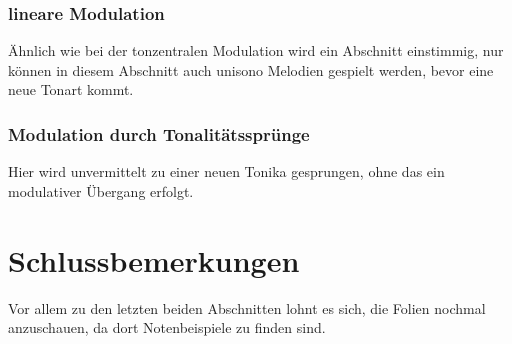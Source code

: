 \documentclass[a4paper]{article}
\begin{document}
	\subsubsection{lineare Modulation}
	Ähnlich wie bei der tonzentralen Modulation wird ein Abschnitt einstimmig, nur können in diesem Abschnitt auch unisono Melodien gespielt werden, bevor eine neue Tonart kommt.
	
	\subsubsection{Modulation durch Tonalitätssprünge}
	Hier wird unvermittelt zu einer neuen Tonika gesprungen, ohne das ein modulativer Übergang erfolgt.
	
	\section{Schlussbemerkungen}
	Vor allem zu den letzten beiden Abschnitten lohnt es sich, die Folien nochmal anzuschauen, da dort Notenbeispiele zu finden sind.
	
\end{document}
